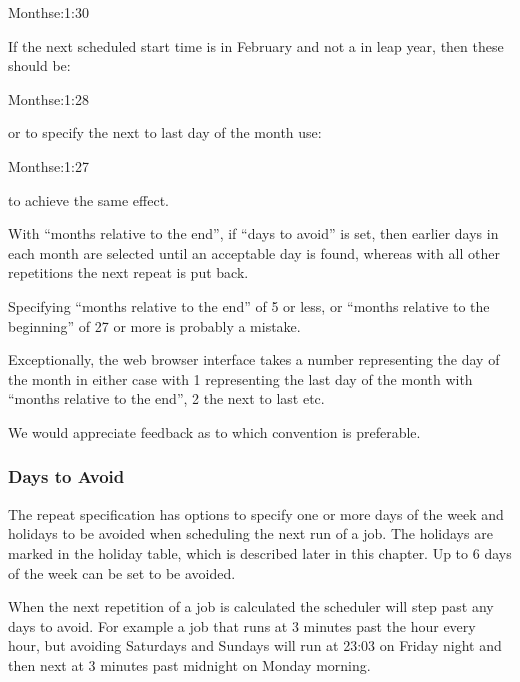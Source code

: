\begin{expara}

Monthse:1:30

\end{expara}

If the next scheduled start time is in February and not a in leap year, then these should be:

\begin{expara}

Monthse:1:28

\end{expara}

or to specify the next to last day of the month use:

\begin{expara}

Monthse:1:27

\end{expara}

to achieve the same effect.

With ``months relative to the end'', if ``days to avoid'' is set, then earlier days in each month are selected until an acceptable day is found, whereas
with all other repetitions the next repeat is put back.

Specifying ``months relative to the end'' of 5 or less, or ``months relative to the beginning'' of 27 or more is probably a mistake.

Exceptionally, the web browser interface takes a number representing the day of the month in either case with 1 representing the last day of the
month with ``months relative to the end'', 2 the next to last etc.

We would appreciate feedback as to which convention is preferable.

\subsubsection{Days to Avoid}
The repeat specification has options to specify one or more days of the week and holidays to be avoided when scheduling the next run of a job.
The holidays are marked in the holiday table, which is described later in this chapter. Up to 6 days of the week can be set to be avoided.

When the next repetition of a job is calculated the scheduler will step past any days to avoid. For example a job that runs at 3 minutes past
the hour every hour, but avoiding Saturdays and Sundays will run at 23:03 on Friday night and then next at 3 minutes past midnight on
Monday morning.

